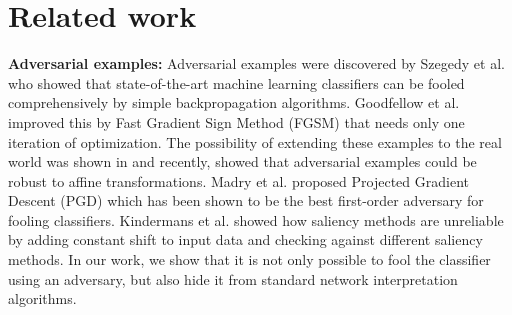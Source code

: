 \documentclass[10pt,twocolumn,letterpaper]{article}
\begin{document}
\section{Related work}{\bf Adversarial examples:}
Adversarial examples were discovered by Szegedy et al. \cite{intriguing-arxiv-2013} who showed that state-of-the-art machine learning classifiers can be fooled comprehensively by simple backpropagation algorithms. Goodfellow et al. \cite{explainingharnessing-arxiv-2014} improved this by Fast Gradient Sign Method (FGSM) that needs only one iteration of optimization. The possibility of extending these examples to the real world was shown in \cite{world-arxiv-2016,sharif2016accessorize} and recently, \cite{athalye2017synthesizing} showed that adversarial examples could be robust to affine transformations. Madry et al. \cite{madry2017towards} proposed Projected Gradient Descent (PGD) which has been shown to be the best first-order adversary for fooling classifiers.
Kindermans et al. \cite{kindermans2017reliability} showed how saliency methods are unreliable by adding constant shift to input data and checking against different saliency methods. In our work, we show that it is not only possible to fool the classifier using an adversary, but also hide it from standard network interpretation algorithms.
\end{document}
